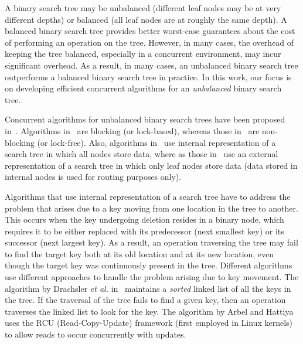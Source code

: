 A binary search tree may be unbalanced (different leaf nodes may be at very different depths) or balanced (all leaf nodes are at roughly the same depth). A balanced binary search tree provides better worst-case guarantees about the cost of performing an operation on the tree. However, in many cases, the overhead of keeping the tree balanced, especially in a concurrent environment, may incur significant overhead. As a result, in many cases, an unbalanced binary search tree  outperforms a balanced binary search tree in practice. In this work, our focus is on developing efficient concurrent algorithms for an \emph{unbalanced} binary search tree. 

Concurrent algorithms for unbalanced binary search trees have been proposed in~\cite{EllFat+:2010:PODC,HowJon:2012:SPAA,NatMit:2014:PPoPP,DraVec+:2014:PPoPP,EllFat+:2014:PODC,ChaDan+:2014:PODC,ArbAtt:2014:PODC}. Algorithms in~\cite{DraVec+:2014:PPoPP,ArbAtt:2014:PODC} are blocking (or lock-based), whereas those in~\cite{EllFat+:2010:PODC,HowJon:2012:SPAA,NatMit:2014:PPoPP,EllFat+:2014:PODC,ChaDan+:2014:PODC} are non-blocking (or lock-free). Also, algorithms in~\cite{HowJon:2012:SPAA,DraVec+:2014:PPoPP,ArbAtt:2014:PODC,ChaDan+:2014:PODC} use internal representation of a search tree in which all nodes store data, where as those in~\cite{EllFat+:2010:PODC,NatMit:2014:PPoPP,EllFat+:2014:PODC} use an external representation of  a search tree in which only leaf nodes store data (data stored in internal nodes is used for routing purposes only).

Algorithms that use internal representation of a search tree have to address the problem that arises due to a key moving from one location in the tree to another. This occurs when the key undergoing deletion resides in a binary node, which requires it to be either replaced with its predecessor (next smallest key) or its successor (next largest key). As a result, an operation traversing the tree may fail to find the target key both at its old location and at its new location, even though the target key was continuously present in the tree. Different algorithms use different approaches to handle the problem arising due to key movement. The algorithm by Drachsler \emph{et al.} in~\cite{DraVec+:2014:PPoPP} maintains a \emph{sorted} linked list of all the keys in the tree. If the traversal of the tree fails to find a given key, then an operation traverses the linked list to look for the key. The algorithm by Arbel and Hattiya~\cite{ArbAtt:2014:PODC} uses the RCU (Read-Copy-Update) framework (first employed in Linux kernels) to allow reads to occur concurrently with updates.

